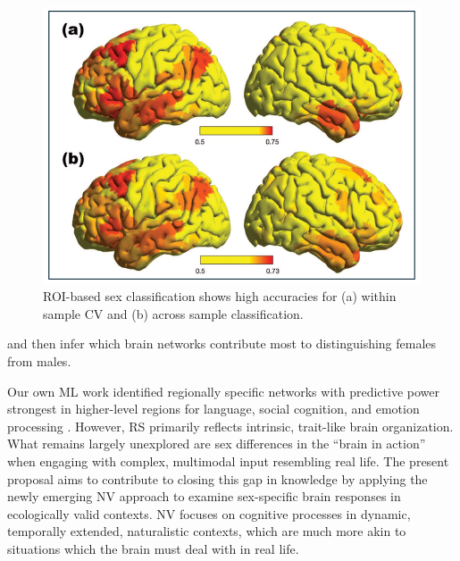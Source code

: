 \documentclass[11pt,a4paper]{article}
\begin{document}
\begin{figure} %
  \vspace{-10pt} %
  \includegraphics[width=\linewidth]{sex_classification.png}
  \caption{ROI-based sex classification shows high accuracies for (a) within sample CV and (b) across sample classification.}
  \label{fig:sexclass}
\end{figure}
and then infer which brain networks contribute most to distinguishing females from males.
\par\vspace{-1\parskip}\noindent
Our own ML work identified regionally specific networks with predictive power strongest in higher-level regions 
for language, social cognition, and emotion processing 
\parencite{weisSexClassificationResting2020a,wierschAccurateSexPrediction2023a,wierschSexDifferencesBrain2021a}.
However, RS primarily reflects intrinsic, trait-like brain organization. \\
What remains largely unexplored are 
sex differences in the “brain in action” when engaging with complex, multimodal input resembling real life. 
The present proposal aims to contribute to closing this gap in knowledge by applying the newly 
emerging NV approach to examine sex-specific brain responses in ecologically valid contexts. 
NV focuses on 
cognitive processes in dynamic, temporally extended, naturalistic contexts, which are much more akin to
situations which the brain must deal with in real life.
\par\vspace{-0.5\parskip}\noindent %
\end{document}
